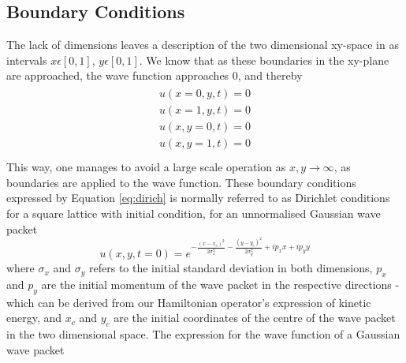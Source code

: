 \documentclass[10pt, nofootinbib, twocolumn]{revtex4-1}
\begin{document}
\subsection{Boundary Conditions}
The lack of dimensions leaves a description of the two dimensional xy-space in as intervals $x\epsilon[0,1]$, $y\epsilon[0,1]$. We know that as these boundaries in the xy-plane are approached, the wave function approaches 0, and thereby
\begin{align}\label{eq:dirich}
    \begin{split}
        u(x=0,y,t)=0 \\
        u(x=1,y,t)=0 \\
        u(x,y=0,t)=0 \\
        u(x,y=1,t)=0 \\
    \end{split}
\end{align}
This way, one manages to avoid a large scale operation as $x,y \longrightarrow \infty$, as boundaries are applied to the wave function. These boundary conditions expressed by Equation \eqref{eq:dirich} is normally referred to as Dirichlet conditions \cite[p. ~333]{notes} for a square lattice with initial condition, for an unnormalised Gaussian wave packet
\begin{equation}\label{eq:init}
    u(x,y,t=0) = e^{-\frac{(x-x_c)^2}{2 \sigma_x^2} - \frac{(y-y_c)^2}{2 \sigma_y^2} + i p_x x + i p_y y}
\end{equation}
where $\sigma_x$ and $\sigma_y$ refers to the initial standard deviation in both dimensions, $p_x$ and $p_y$ are the initial momentum of the wave packet in the respective directions - which can be derived from our Hamiltonian operator's expression of kinetic energy, and $x_c$ and $y_c$ are the initial coordinates of the centre of the wave packet in the two dimensional space. The expression for the wave function of a Gaussian wave packet


%
\end{document}
